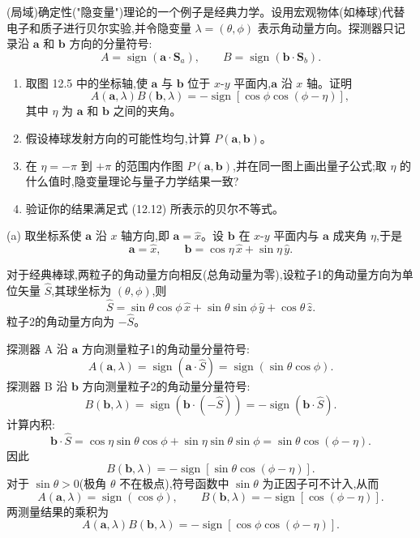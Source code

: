 \begin{question}
(局域)确定性("隐变量")理论的一个例子是经典力学。设用宏观物体(如棒球)代替电子和质子进行贝尔实验,并令隐变量 $\lambda=(\theta,\phi)$ 表示角动量方向。探测器只记录沿 $\mathbf a$ 和 $\mathbf b$ 方向的分量符号:
\[
A=\operatorname{sign}(\mathbf a\cdot\mathbf S_a),\qquad B=\operatorname{sign}(\mathbf b\cdot\mathbf S_b).
\]
\begin{enumerate}
\item 取图 12.5 中的坐标轴,使 $\mathbf a$ 与 $\mathbf b$ 位于 $x$-$y$ 平面内,$\mathbf a$ 沿 $x$ 轴。证明
\[
A(\mathbf a,\lambda)B(\mathbf b,\lambda)=-\operatorname{sign}[\cos\phi\cos(\phi-\eta)],
\]
其中 $\eta$ 为 $\mathbf a$ 和 $\mathbf b$ 之间的夹角。
\item 假设棒球发射方向的可能性均匀,计算 $P(\mathbf a,\mathbf b)$。
\item 在 $\eta=-\pi$ 到 $+\pi$ 的范围内作图 $P(\mathbf a,\mathbf b)$,并在同一图上画出量子公式;取 $\eta$ 的什么值时,隐变量理论与量子力学结果一致?
\item 验证你的结果满足式 (12.12) 所表示的贝尔不等式。
\end{enumerate}

\par\smallskip
{}

\begin{solution}
(a) 取坐标系使 $\mathbf a$ 沿 $x$ 轴方向,即 $\mathbf a = \hat x$。设 $\mathbf b$ 在 $x$-$y$ 平面内与 $\mathbf a$ 成夹角 $\eta$,于是
\[
\mathbf a = \hat x,\qquad \mathbf b = \cos\eta\,\hat x + \sin\eta\,\hat y.
\]

对于经典棒球,两粒子的角动量方向相反(总角动量为零),设粒子1的角动量方向为单位矢量 $\hat S$,其球坐标为 $(\theta,\phi)$,则
\[
\hat S = \sin\theta\cos\phi\,\hat x + \sin\theta\sin\phi\,\hat y + \cos\theta\,\hat z.
\]
粒子2的角动量方向为 $-\hat S$。

探测器 A 沿 $\mathbf a$ 方向测量粒子1的角动量分量符号:
\[
A(\mathbf a,\lambda) = \operatorname{sign}(\mathbf a\cdot\hat S) = \operatorname{sign}(\sin\theta\cos\phi).
\]
探测器 B 沿 $\mathbf b$ 方向测量粒子2的角动量分量符号:
\[
B(\mathbf b,\lambda) = \operatorname{sign}(\mathbf b\cdot(-\hat S)) = -\operatorname{sign}(\mathbf b\cdot\hat S).
\]
计算内积:
\[
\mathbf b\cdot\hat S = \cos\eta\sin\theta\cos\phi + \sin\eta\sin\theta\sin\phi = \sin\theta\cos(\phi-\eta).
\]
因此
\[
B(\mathbf b,\lambda) = -\operatorname{sign}[\sin\theta\cos(\phi-\eta)].
\]
对于 $\sin\theta > 0$(极角 $\theta$ 不在极点),符号函数中 $\sin\theta$ 为正因子可不计入,从而
\[
A(\mathbf a,\lambda) = \operatorname{sign}(\cos\phi),\qquad
B(\mathbf b,\lambda) = -\operatorname{sign}[\cos(\phi-\eta)].
\]
两测量结果的乘积为
\[
\boxed{A(\mathbf a,\lambda)B(\mathbf b,\lambda) = -\operatorname{sign}[\cos\phi\cos(\phi-\eta)].}
\]


\end{solution}
\end{question}
